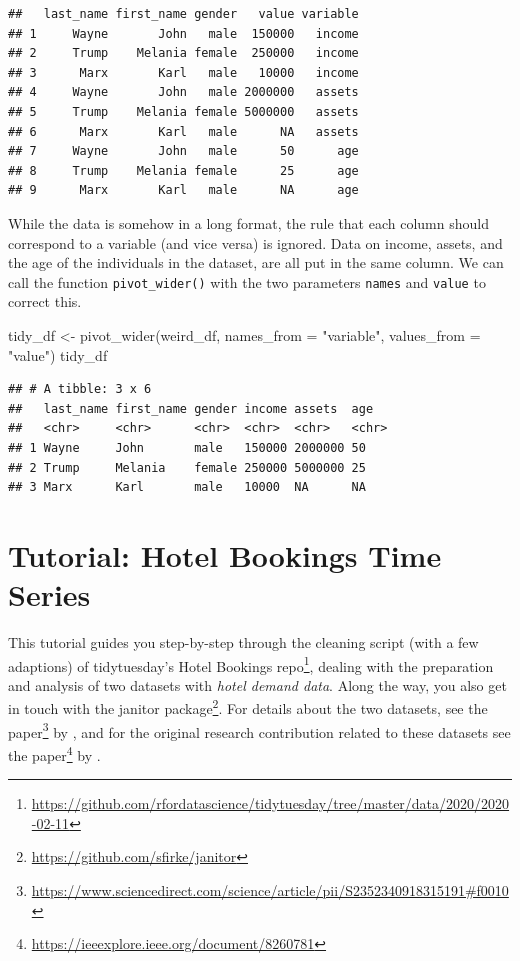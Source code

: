 \documentclass[
  12pt,
]{style/krantz}
\newenvironment{Shaded}{\begin{snugshade}}{\end{snugshade}}
\newcommand{\AttributeTok}[1]{\textcolor[rgb]{0.77,0.63,0.00}{#1}}
\newcommand{\FunctionTok}[1]{\textcolor[rgb]{0.00,0.00,0.00}{#1}}
\newcommand{\NormalTok}[1]{#1}
\newcommand{\OtherTok}[1]{\textcolor[rgb]{0.56,0.35,0.01}{#1}}
\newcommand{\StringTok}[1]{\textcolor[rgb]{0.31,0.60,0.02}{#1}}
\renewcommand{\href}[2]{#2\footnote{\url{#1}}}
\begin{document}
\begin{verbatim}
##   last_name first_name gender   value variable
## 1     Wayne       John   male  150000   income
## 2     Trump    Melania female  250000   income
## 3      Marx       Karl   male   10000   income
## 4     Wayne       John   male 2000000   assets
## 5     Trump    Melania female 5000000   assets
## 6      Marx       Karl   male      NA   assets
## 7     Wayne       John   male      50      age
## 8     Trump    Melania female      25      age
## 9      Marx       Karl   male      NA      age
\end{verbatim}

While the data is somehow in a long format, the rule that each column should correspond to a variable (and vice versa) is ignored. Data on income, assets, and the age of the individuals in the dataset, are all put in the same column. We can call the function \texttt{pivot\_wider()} with the two parameters \texttt{names} and \texttt{value} to correct this.

\begin{Shaded}
\begin{Highlighting}[]
\NormalTok{tidy\_df }\OtherTok{\textless{}{-}} \FunctionTok{pivot\_wider}\NormalTok{(weird\_df, }\AttributeTok{names\_from =} \StringTok{"variable"}\NormalTok{, }\AttributeTok{values\_from =} \StringTok{"value"}\NormalTok{)}
\NormalTok{tidy\_df}
\end{Highlighting}
\end{Shaded}

\begin{verbatim}
## # A tibble: 3 x 6
##   last_name first_name gender income assets  age  
##   <chr>     <chr>      <chr>  <chr>  <chr>   <chr>
## 1 Wayne     John       male   150000 2000000 50   
## 2 Trump     Melania    female 250000 5000000 25   
## 3 Marx      Karl       male   10000  NA      NA
\end{verbatim}

\hypertarget{tutorial-hotel-bookings-time-series}{%
\section{Tutorial: Hotel Bookings Time Series}\label{tutorial-hotel-bookings-time-series}}

This tutorial guides you step-by-step through the cleaning script (with a few adaptions) of \href{https://github.com/rfordatascience/tidytuesday/tree/master/data/2020/2020-02-11}{tidytuesday's Hotel Bookings repo}, dealing with the preparation and analysis of two datasets with \emph{hotel demand data}. Along the way, you also get in touch with the \href{https://github.com/sfirke/janitor}{janitor package}. For details about the two datasets, see the \href{https://www.sciencedirect.com/science/article/pii/S2352340918315191\#f0010}{paper} by \citet{nuno_etal2019}, and for the original research contribution related to these datasets see the \href{https://ieeexplore.ieee.org/document/8260781}{paper} by \citet{nunes_etal2017}.
\end{document}
